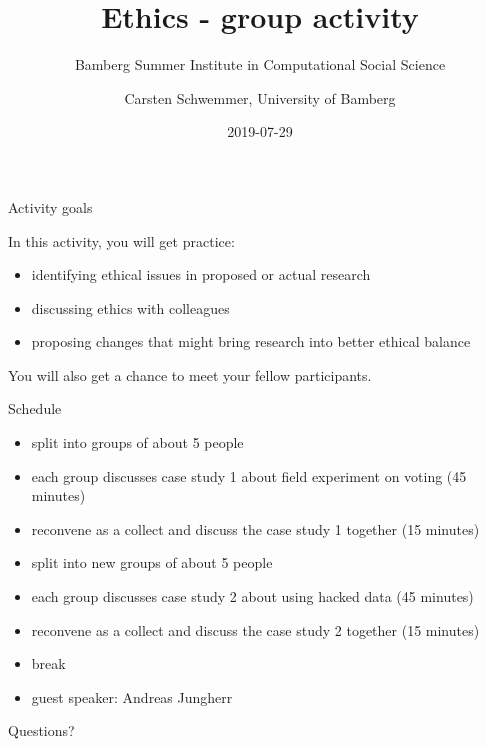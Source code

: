 \documentclass{beamer}
\title{Ethics - group activity}
\subtitle{Bamberg Summer Institute in Computational Social Science}
\author{Carsten Schwemmer, University of Bamberg}
\institute{\textit{Many thanks to Matthew Salganik for providing material for this lecture}}
\date{2019-07-29}
\begin{document}
	\maketitle
	
	

\begin{frame}{Activity goals}

In this activity, you will get practice:
\begin{itemize}
\item identifying ethical issues in proposed or actual research
\item discussing ethics with colleagues
\item proposing changes that might bring research into better ethical balance
\end{itemize}
\vfill
You will also get a chance to meet your fellow participants.

\end{frame}
\begin{frame}{Schedule}

\begin{itemize}
\item split into groups of about 5 people
\item each group discusses case study 1 about field experiment on voting (45 minutes)
\item reconvene as a collect and discuss the case study 1 together (15 minutes)
\item split into new groups of about 5 people
\item each group discusses case study 2 about using hacked data (45 minutes)
\item reconvene as a collect and discuss the case study 2 together (15 minutes)
\item break
\item guest speaker: Andreas Jungherr
\end{itemize}

\end{frame}
\begin{frame}[standout]

\begin{center}
	\LARGE
	Questions?
\end{center}

\end{frame}
\end{document}
